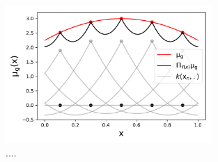 \documentclass[twoside,11pt]{book}
\numberwithin{theorem}{chapter}
\numberwithin{definition}{chapter}
\numberwithin{proposition}{chapter}
\numberwithin{corollary}{chapter}
\numberwithin{example}{chapter}
\numberwithin{lemma}{chapter}
\numberwithin{assumption}{chapter}
\numberwithin{equation}{chapter}
\numberwithin{figure}{chapter}
\DeclareMathOperator{\Tr}{Tr}
\DeclareMathOperator{\eff}{\mathrm{eff}}
\DeclareMathOperator{\F}{\mathcal{F}}
\begin{document}


\begin{figure}[h]
\centering
\includegraphics[width= 0.7\textwidth]{img/reconstruction/signal_reconstruction_spread_nodes.pdf}
\caption{.... \label{fig:introduction_reconstuction}}
\end{figure}


\end{document}
